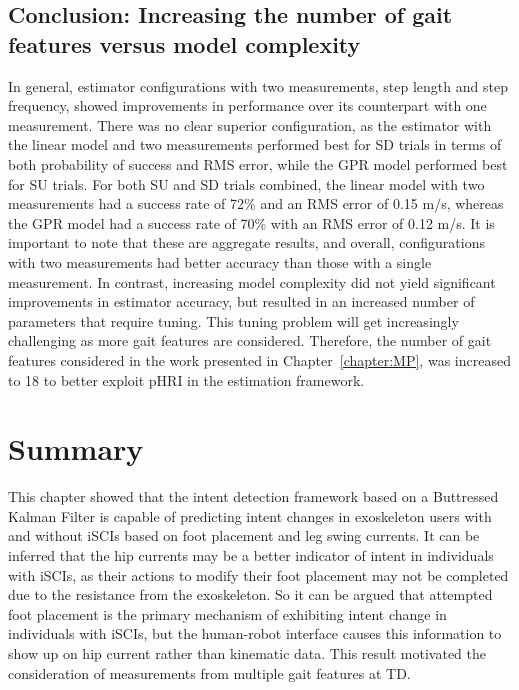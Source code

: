 \subsection{Conclusion: Increasing the number of gait features versus model complexity}\label{sec:analysis_conc}
In general, estimator configurations with two measurements, step length and step frequency, showed improvements in performance over its counterpart with one measurement. There was no clear superior configuration, as the estimator with the linear model and two measurements performed best for SD trials in terms of both probability of success and RMS error, while the GPR model performed best for SU trials. For both SU and SD trials combined, the linear model with two measurements had a success rate of 72\% and an RMS error of 0.15 m/s, whereas the GPR model had a success rate of 70\% with an RMS error of 0.12 m/s. It is important to note that these are aggregate results, and overall, configurations with two measurements had better accuracy than those with a single measurement. In contrast, increasing  model complexity did not yield significant improvements in estimator accuracy, but resulted in an increased number of parameters that require tuning. This tuning problem will get increasingly challenging as more gait features are considered. Therefore, the number of gait features considered in the work presented in Chapter~\ref{chapter:MP}, was increased to 18 to better exploit pHRI in the estimation framework.

\section{Summary}\label{sec:bkf_summary}

This chapter showed that the intent detection framework based on a Buttressed Kalman Filter is capable of predicting intent changes in exoskeleton users with and without iSCIs based on foot placement and leg swing currents. It can be inferred that the hip currents may be a better indicator of intent in individuals with iSCIs, as their actions to modify their foot placement may not be completed due to the resistance from the exoskeleton. So it can be argued that attempted foot placement is the primary mechanism of exhibiting intent change in individuals with iSCIs, but the human-robot interface causes this information to show up on hip current rather than kinematic data. This result motivated the consideration of measurements from multiple gait features at TD.

